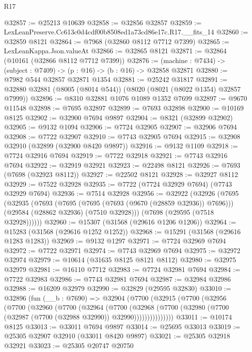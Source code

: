 \begin{lexlean}{R17}
\begin{coremodule}
@32857 := @25213 @10639
@32858 := @32856 @32857
@32859 := LexLeanPreserve.Cc613c0d4cdf00b8508ed1a73cd86e17c.R17.__fits_14
@32860 := @32859 @8121
@32864 := @7968 (@32860 @8112 @7712 @7399)
@32865 := LexLeanKappa.Json.valueAt
@32866 := @32865 @8121
@32871 := @32864 (@10161 (@32866 @8112 @7712 @7399))
@32876 := (machine : @7434) -> (subject : @7409) -> (p : @16) -> (b : @16) -> @32858 @32871
@32880 := @7982 @544 @32857 @32871 @1354
@32881 := @25242 @31817
@32891 := @32880 @32881 (@8005 (@8014 @544)) (@8020 (@8021 (@8022 @1354) @32857 @7999))
@32896 := @8310 @32881 @1076 @1089 @1352 @7699
@32897 := @9670 @11548
@32898 := @7695 @32897
@32899 := @7693 @32898
@32900 := @10169 @8125
@32902 := @32900 @7694 @9897
@32904 := @8321 (@32899 @32902)
@32905 := @9132 @1094
@32906 := @7724 @32905
@32907 := @32906 @7694
@32908 := @7722 @32907
@32910 := @7743 @32905 @7694
@32915 := @32908 @32910 (@32899 (@32900 @8420 @9897))
@32916 := @9132 @1109
@32918 := @7724 @32916 @7694
@32919 := @7722 @32918
@32921 := @7743 @32916 @7694
@32922 := @32919 @32921
@32923 := @22498 @8121
@32926 := @7693 (@7698 (@32923 @8112))
@32927 := @22502 @8121
@32928 := @32927 @8112
@32929 := @7522 @32928
@32935 := @7722 (@7724 @32929 @7694) (@7743 @32929 @7694)
@32936 := @7514 @32928
@32956 := @32922
    (@32926
      (@7695
        (@32935
          (@7693
            (@7695 (@7695 (@7693 (@9670 (@28859 @32936)) @7696)))
            (@29584 (@28862 @32936) (@7510 @32928)))
          (@7698 (@29595 (@7518 @32928))))))
@32960 := @15307 (@31568 (@29616 @1206 @1206))
@32964 := @15283 (@31568 (@29616 @1252 @1252))
@32968 := @15291 (@31568 (@29616 @1283 @1283))
@32969 := @9132 @1297
@32971 := @7724 @32969 @7694
@32972 := @7722 @32971
@32974 := @7743 @32969 @7694
@32975 := @32972 @32974
@32979 := @10614 (@31635 @8125 @8121 @8112)
@32980 := @32975 @32979
@32981 := @16110 @7712
@32983 := @7724 @32981 @7694
@32984 := @7722 @32983
@32986 := @7743 @32981 @7694
@32987 := @32984 @32986
@32988 := @16209 @32979
@32990 := @32829 (@29595 @32830)
@33010 := @32896
    (fun (__b : @7690) =>
    @32904
      (@7700
        (@32915
          (@7700
            (@32956
              (@7700
                (@32960
                  (@7700
                    (@32964
                      (@7700
                        (@32968
                          (@7700
                            (@32980 (@7700 (@32987 (@7700 (@32988 @32990)) @32990)))))))))))))))
@33011 := @10174 @8125
@33013 := @33011 @7694 @9897
@33014 := @25695 @33013
@33019 := @25305 @32907 @32910 (@33011 @8420 @9897)
@33021 := @25305 @32918 @32921
@33023 := @25305 @20747 @20750

\end{coremodule}
\end{lexlean}
